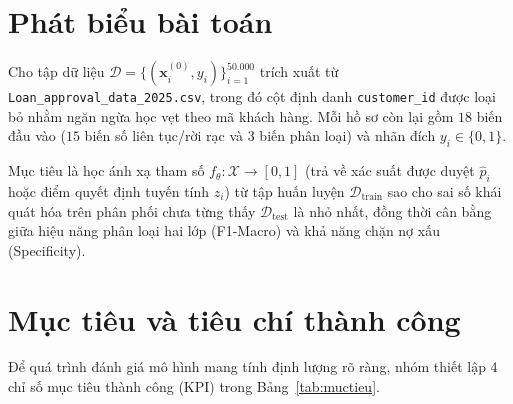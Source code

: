 \documentclass[12pt,a4paper,oneside]{report}
\begin{document}
\section{Phát biểu bài toán}

Cho tập dữ liệu $\mathcal{D} = \{(\mathbf{x}_i^{(0)}, y_i)\}_{i=1}^{50.000}$ trích xuất từ \texttt{Loan\_approval\_data\_2025.csv}, trong đó cột định danh \texttt{customer\_id} được loại bỏ nhằm ngăn ngừa học vẹt theo mã khách hàng. Mỗi hồ sơ còn lại gồm $18$ biến đầu vào ($15$ biến số liên tục/rời rạc và $3$ biến phân loại) và nhãn đích $y_i \in \{0, 1\}$.

Mục tiêu là học ánh xạ tham số $f_{\theta}: \mathcal{X} \rightarrow [0, 1]$ (trả về xác suất được duyệt $\hat{p}_i$ hoặc điểm quyết định tuyến tính $z_i$) từ tập huấn luyện $\mathcal{D}_{\text{train}}$ sao cho sai số khái quát hóa trên phân phối chưa từng thấy $\mathcal{D}_{\text{test}}$ là nhỏ nhất, đồng thời cân bằng giữa hiệu năng phân loại hai lớp (F1-Macro) và khả năng chặn nợ xấu (Specificity).

\section{Mục tiêu và tiêu chí thành công}

Để quá trình đánh giá mô hình mang tính định lượng rõ ràng, nhóm thiết lập 4 chỉ số mục tiêu thành công (KPI) trong Bảng~\ref{tab:muctieu}.

\begin{table}[H]
  \caption{Chỉ số mục tiêu và tiêu chí đánh giá thành công của mô hình.}
  \label{tab:muctieu}
\end{table}
\end{document}
